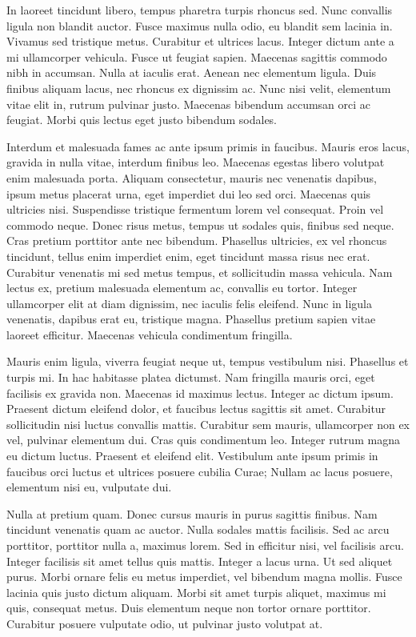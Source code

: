 In laoreet tincidunt libero, tempus pharetra turpis rhoncus sed. Nunc convallis ligula non blandit auctor. Fusce maximus nulla odio, eu blandit sem lacinia in. Vivamus sed tristique metus. Curabitur et ultrices lacus. Integer dictum ante a mi ullamcorper vehicula. Fusce ut feugiat sapien. Maecenas sagittis commodo nibh in accumsan. Nulla at iaculis erat. Aenean nec elementum ligula. Duis finibus aliquam lacus, nec rhoncus ex dignissim ac. Nunc nisi velit, elementum vitae elit in, rutrum pulvinar justo. Maecenas bibendum accumsan orci ac feugiat. Morbi quis lectus eget justo bibendum sodales.

Interdum et malesuada fames ac ante ipsum primis in faucibus. Mauris eros lacus, gravida in nulla vitae, interdum finibus leo. Maecenas egestas libero volutpat enim malesuada porta. Aliquam consectetur, mauris nec venenatis dapibus, ipsum metus placerat urna, eget imperdiet dui leo sed orci. Maecenas quis ultricies nisi. Suspendisse tristique fermentum lorem vel consequat. Proin vel commodo neque. Donec risus metus, tempus ut sodales quis, finibus sed neque. Cras pretium porttitor ante nec bibendum. Phasellus ultricies, ex vel rhoncus tincidunt, tellus enim imperdiet enim, eget tincidunt massa risus nec erat. Curabitur venenatis mi sed metus tempus, et sollicitudin massa vehicula. Nam lectus ex, pretium malesuada elementum ac, convallis eu tortor. Integer ullamcorper elit at diam dignissim, nec iaculis felis eleifend. Nunc in ligula venenatis, dapibus erat eu, tristique magna. Phasellus pretium sapien vitae laoreet efficitur. Maecenas vehicula condimentum fringilla.

Mauris enim ligula, viverra feugiat neque ut, tempus vestibulum nisi. Phasellus et turpis mi. In hac habitasse platea dictumst. Nam fringilla mauris orci, eget facilisis ex gravida non. Maecenas id maximus lectus. Integer ac dictum ipsum. Praesent dictum eleifend dolor, et faucibus lectus sagittis sit amet. Curabitur sollicitudin nisi luctus convallis mattis. Curabitur sem mauris, ullamcorper non ex vel, pulvinar elementum dui. Cras quis condimentum leo. Integer rutrum magna eu dictum luctus. Praesent et eleifend elit. Vestibulum ante ipsum primis in faucibus orci luctus et ultrices posuere cubilia Curae; Nullam ac lacus posuere, elementum nisi eu, vulputate dui.

Nulla at pretium quam. Donec cursus mauris in purus sagittis finibus. Nam tincidunt venenatis quam ac auctor. Nulla sodales mattis facilisis. Sed ac arcu porttitor, porttitor nulla a, maximus lorem. Sed in efficitur nisi, vel facilisis arcu. Integer facilisis sit amet tellus quis mattis. Integer a lacus urna. Ut sed aliquet purus. Morbi ornare felis eu metus imperdiet, vel bibendum magna mollis. Fusce lacinia quis justo dictum aliquam. Morbi sit amet turpis aliquet, maximus mi quis, consequat metus. Duis elementum neque non tortor ornare porttitor. Curabitur posuere vulputate odio, ut pulvinar justo volutpat at. 


